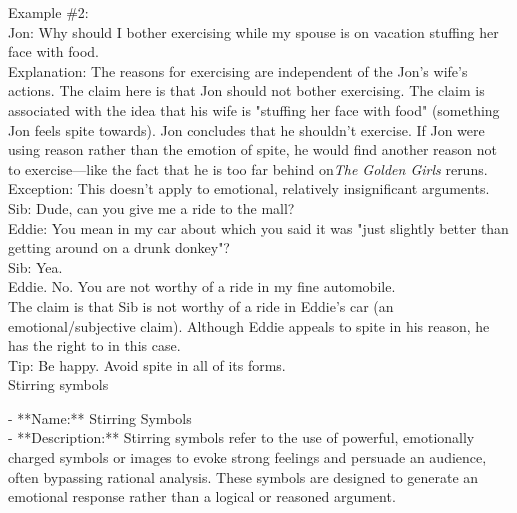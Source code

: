 \documentclass[a4paper,12pt,single,pdftex]{scrartcl}
\begin{document}
    
      Example \#2:
    \\

    
      Jon: Why should I bother exercising while my spouse is on vacation stuffing her face with food.
    \\

    
      Explanation: The reasons for exercising are independent of the Jon's wife's actions. The claim here is that Jon should not bother exercising. The claim is associated with the idea that his wife is "stuffing her face with food" (something Jon feels spite towards). Jon concludes that he shouldn't exercise. If Jon were using reason rather than the emotion of spite, he would find another reason not to exercise—like the fact that he is too far behind on{\it  The Golden Girls}  reruns.
    \\

    
      Exception: This doesn't apply to emotional, relatively insignificant arguments.
    \\

    
      Sib: Dude, can you give me a ride to the mall?
    \\

    
      Eddie: You mean in my car about which you said it was "just slightly better than getting around on a drunk donkey"?
    \\

    
      Sib: Yea.
    \\

    
      Eddie. No. You are not worthy of a ride in my fine automobile.
    \\

    
      The claim is that Sib is not worthy of a ride in Eddie's car (an emotional/subjective claim). Although Eddie appeals to spite in his reason, he has the right to in this case.
    \\

    
      Tip: Be happy. Avoid spite in all of its forms.
    \\

  

Stirring symbols
    
      - **Name:** Stirring Symbols
    \\

    
      - **Description:** Stirring symbols refer to the use of powerful, emotionally charged symbols or images to evoke strong feelings and persuade an audience, often bypassing rational analysis. These symbols are designed to generate an emotional response rather than a logical or reasoned argument.
    \\
\end{document}
